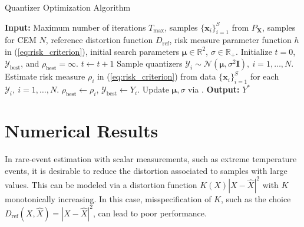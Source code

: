 \documentclass[conference]{IEEEtran}
\begin{document}
\begin{algorithm}
	\caption{Quantizer Optimization Algorithm}\label{alg:optimization}
	\begin{algorithmic}[1]
		\STATE \textbf{Input:} Maximum number of iterations $T_{\max}$, samples  $\{\mathbf{x}_i\}_{i=1}^S$ from $P_{\mathbf{X}}$, samples for CEM $N$, reference distortion function $D_{\mathrm{ref}}$, risk measure parameter function $h$ in (\ref{eq:risk_criterion}), initial search parameters $\boldsymbol{\mu} \in \mathbb{R}^2$, $\sigma \in \mathbb{R}_+$. \STATE Initialize $t = 0$, $\mathcal{Y}_{\mathrm{best}}$, and $\rho_{\mathrm{best}} = \infty$. 
		\STATE $t \leftarrow t+1$
		\STATE Sample quantizers $\mathcal{Y}_i \sim \mathcal{N}(\boldsymbol{\mu},\sigma^2\mathbf{I}),~i = 1,\ldots,N$.
		\STATE Estimate risk measure $\rho_i$ in (\ref{eq:risk_criterion}) from data $\{\mathbf{x}_i\}_{i=1}^S$ for each $\mathcal{Y}_i,~i = 1,\ldots,N$.
		\STATE $\rho_{\mathrm{best}} \leftarrow \rho_i$, $\mathcal{Y}_{\mathrm{best}} \leftarrow Y_i$.
		\ENDIF
		\STATE Update $\boldsymbol{\mu},\sigma$ via \cite[Algorithm 4.1 Eq. (19-21)]{Botev2013cross}.
		\ENDFOR
		\STATE \textbf{Output:} $Y^*$
	\end{algorithmic}
\end{algorithm}

\section{Numerical Results}

In rare-event estimation with scalar measurements, such as extreme temperature events, it is desirable to reduce the distortion associated to samples with large values. This can be modeled via a distortion function $K(X)|X - \hat{X}|^2$ with $K$ monotonically increasing. In this case, misspecification of $K$, such as the choice $D_{\mathrm{ref}}(X,\hat{X}) = |X - \hat{X}|^2$, can lead to poor performance.
\end{document}
